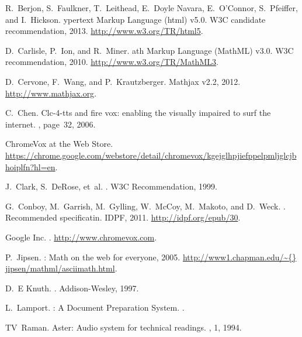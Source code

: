 \documentclass{sig-alternate}
\begin{document}
%  
\begin{thebibliography}{10}

R.~Berjon, S.~Faulkner, T.~Leithead, E.~Doyle Navara, E.~O'Connor, S.~Pfeiffer, and I.~Hickson.
ypertext {M}arkup {L}anguage (html) v5.0.
\newblock W3C candidate recommendation, 2013.
\newblock \url{http://www.w3.org/TR/html5}.

D.~Carlisle, P.~Ion, and R.~Miner.
ath {M}arkup {L}anguage ({MathML}) v3.0. 
\newblock W3C recommendation, 2010. 
\newblock \url{http://www.w3.org/TR/MathML3}.

D.~Cervone, F.~Wang, and P.~Krautzberger.
\newblock Mathjax v2.2, 2012.
\newblock \url{http://www.mathjax.org}.

C.~Chen.
\newblock Clc-4-tts and fire vox: enabling the visually impaired to surf the
  internet.
, page~32, 2006.

ChromeVox at the Web Store.
\newblock \url{https://chrome.google.com/webstore/detail/chromevox/kgejglhpjiefppelpmljglcjbhoiplfn?hl=en}.

J.~Clark, S.~DeRose, et~al.
.
\newblock W3C Recommendation,  1999.

G.~Conboy, M.~Garrish, M.~Gylling, W.~McCoy, M.~Makoto, and
  D.~Weck.
.
\newblock Recommended specificatin. IDPF, 2011.
\newblock \url{http://idpf.org/epub/30}.

{Google} Inc.
.
\newblock \url{http://www.chromevox.com}.

P.~Jipsen.
: Math on the web for everyone, 2005.
\newblock \url{http://www1.chapman.edu/\~{}
  jipsen/mathml/asciimath.html}.

D.~E Knuth.
.
\newblock Addison-Wesley, 1997.

L.~Lamport.
\newblock {\LaTeX}: A Document Preparation System.
.

TV~Raman.
\newblock Aster: Audio system for technical readings.
, 1, 1994.


\end{thebibliography}
\end{document}
